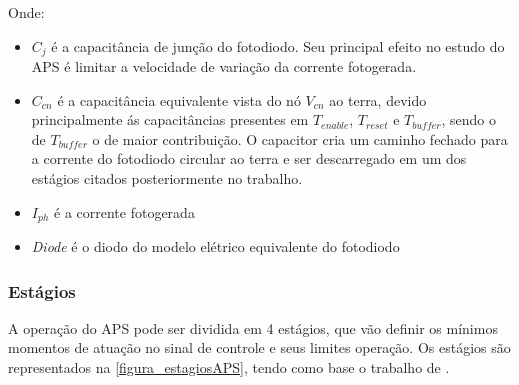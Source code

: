 \clearpage

Onde: 

\begin{itemize}
    \item $C_j$ \'e a capacit\^ancia de jun{\c c}\~ao do fotodiodo. Seu principal efeito no estudo do APS \'e limitar a velocidade de varia{\c c}\~ao da corrente fotogerada.
    \item $C_{cn}$ \'e a capacit\^ancia equivalente vista do n\'o \emph{$V_{cn}$} ao terra, devido principalmente \'as capacit\^ancias presentes em \emph{$T_{enable}$},  \emph{$T_{reset}$} e \emph{$T_{buffer}$}, sendo o de \emph{$T_{buffer}$} o de maior contribui{\c c}\~ao. O capacitor cria um caminho fechado para a corrente do fotodiodo circular ao terra e ser descarregado em um dos est\'agios citados posteriormente no trabalho.
    \item \emph{$I_{ph}$} \'e a corrente fotogerada
    \item \emph{Diode} \'e o diodo do modelo el\'etrico equivalente do fotodiodo
    \emph{}
\end{itemize}

\subsubsection{Est\'agios}
\label{estagiosAPS}

A operação do APS pode ser dividida em 4 est\'agios, que vão definir os m\'inimos momentos de  atua{\c c}\~ao no sinal de controle e seus limites opera{\c c}\~ao. Os est\'agios s\~ao representados na \autoref{figura_estagiosAPS}, tendo como base o trabalho de \cite{LidianeCampos}.

